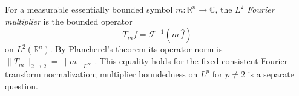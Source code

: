 
For a measurable essentially bounded symbol $m:\mathbb R^n\to\mathbb C$, the \emph{$L^2$ Fourier multiplier} is the bounded operator
\[
T_mf=\mathcal F^{-1}(m\,\widehat f)
\]
on $L^2(\mathbb R^n)$. By Plancherel's theorem its operator norm is $\|T_m\|_{2\to2}=\|m\|_{L^\infty}$. This equality holds for the fixed consistent Fourier-transform normalization; multiplier boundedness on $L^p$ for $p\ne2$ is a separate question.
